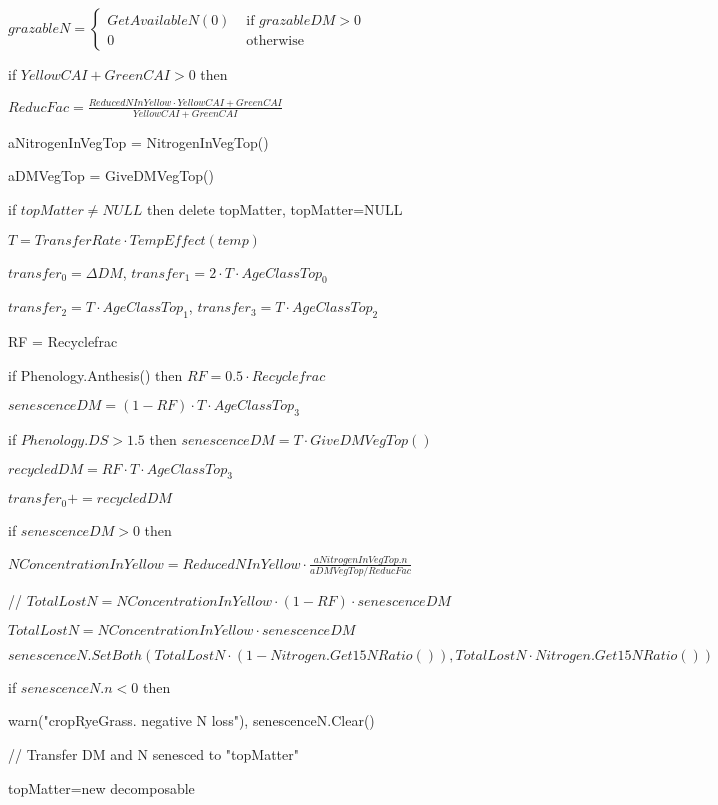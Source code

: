 \documentclass[%
]{scrartcl}
\begin{document}
   $	grazableN = \begin{cases}
           GetAvailableN(0) & \text{ if } grazableDM>0 \\
   	                 0  & \text{ otherwise}
   	            \end{cases}$

   if $YellowCAI+GreenCAI > 0$ then

   \quad 	$ReducFac = \tfrac{ReducedNInYellow \cdot YellowCAI+GreenCAI}{YellowCAI+GreenCAI}$
   
   aNitrogenInVegTop = NitrogenInVegTop()

   aDMVegTop = GiveDMVegTop()

if $topMatter \ne NULL$ then delete topMatter, topMatter=NULL
  
   $T=TransferRate \cdot TempEffect(temp)$

  $ transfer_0=\Delta DM$,
   $transfer_1=2 \cdot T \cdot AgeClassTop_0$

   $transfer_2=T \cdot AgeClassTop_1$,
  $ transfer_3=T \cdot AgeClassTop_2$

   RF = Recyclefrac

   if Phenology.Anthesis() then $RF = 0.5 \cdot Recyclefrac$


   $senescenceDM= (1-RF) \cdot T \cdot AgeClassTop_3$

   if $Phenology.DS > 1.5$ then $senescenceDM = T \cdot GiveDMVegTop()$

   $recycledDM=RF \cdot T \cdot AgeClassTop_3$

  $ transfer_0+=recycledDM  $

   if $senescenceDM>0$ then

 \quad  	$NConcentrationInYellow = ReducedNInYellow \cdot \tfrac{aNitrogenInVegTop.n}{aDMVegTop/ReducFac} $


\quad  // 		$TotalLostN = NConcentrationInYellow \cdot (1-RF) \cdot senescenceDM$

\quad 		$TotalLostN = NConcentrationInYellow \cdot senescenceDM$

 \quad      $ senescenceN.SetBoth(TotalLostN \cdot (1-Nitrogen.Get15NRatio()),TotalLostN \cdot Nitrogen.Get15NRatio())$

 \quad      if $senescenceN.n<0$ then
   	

 \quad   \quad    warn("cropRyeGrass. negative N loss"),  senescenceN.Clear()
     

 \quad      //  Transfer DM and N senesced to "topMatter"

\quad       topMatter=new decomposable
\end{document}
